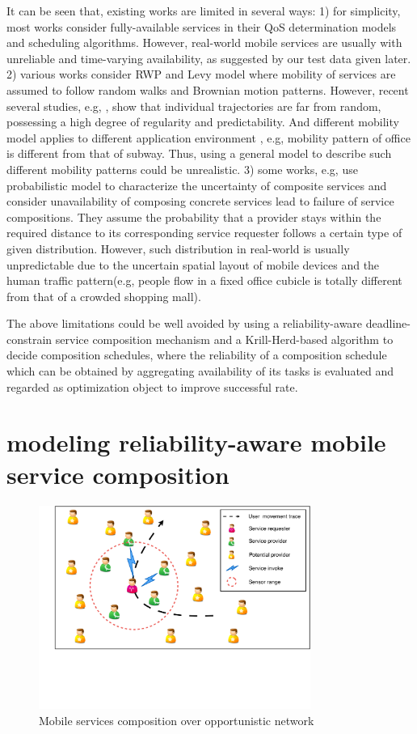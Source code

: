 \documentclass[journal]{IEEEtran}
\begin{document}
It can be seen that, existing works are limited in several ways: 
1) for simplicity, most works consider fully-available services in their QoS determination models and scheduling algorithms. However, real-world mobile services are usually with unreliable and time-varying availability, as suggested by our test data given later.
2) various works consider RWP and Levy model where mobility of services are assumed to follow random walks and Brownian motion patterns. However, recent several studies, e.g, \cite{barbosa2017human, bettstetter2003node, navidi2004improving}, show that individual trajectories are far from random, possessing a high degree of regularity and predictability. And different mobility model applies to different application environment \cite{camp2002survey}, e.g, mobility pattern of office is different from that of subway. Thus, using a general model to describe such different mobility patterns could be unrealistic.
3) some works, e.g, \cite{wang2011exploiting, Deng2016-2} use probabilistic model to characterize the uncertainty of composite services and consider unavailability of composing concrete services lead to failure of service compositions.
They assume the probability that a provider stays within the required distance to its corresponding service requester follows a certain type of given distribution. However, such distribution in real-world is usually unpredictable due to the uncertain spatial layout of mobile devices and the human traffic pattern(e.g, people flow in a fixed office cubicle is totally different from that of a crowded shopping mall). 

The above limitations could be well avoided by using a reliability-aware deadline-constrain service composition mechanism and a Krill-Herd-based algorithm to decide composition schedules, where the reliability of a composition schedule which can be obtained by aggregating availability of its tasks is evaluated and regarded as optimization object to improve successful rate.

\section{modeling reliability-aware mobile service composition}
\begin{figure}[!t]
\centering
\includegraphics[width=3.5in]{./img/pic2.pdf}
\caption{Mobile services composition over opportunistic network}
\label{fig_MSCON}
\end{figure}
\end{document}
